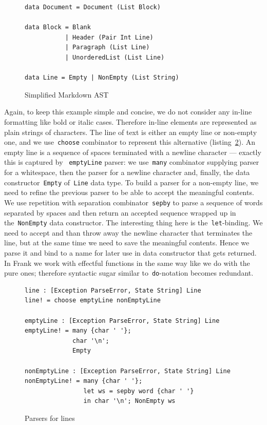       \begin{figure}[h]
      \begin{lstlisting}
data Document = Document (List Block)

data Block = Blank
           | Header (Pair Int Line)
           | Paragraph (List Line)
           | UnorderedList (List Line)

data Line = Empty | NonEmpty (List String)
      \end{lstlisting}
      \caption{Simplified Markdown AST}
      \label{listing:parserMdAstCombo}
      \end{figure}

      Again, to keep this example simple and concise, we do not consider any in-line
      formatting like bold or italic cases. Therefore in-line elements are represented
      as plain strings of characters. The line of text is either an empty line or
      non-empty one, and we use~\texttt{choose} combinator to represent this
      alternative (listing~\ref{listing:parserLineCombo}). An empty line is a sequence of
      spaces terminated with a newline character --- exactly this is captured by
      ~\texttt{emptyLine} parser: we use~\texttt{many} combinator supplying parser
      for a whitespace, then the parser for a newline character and, finally, the
      data constructor~\texttt{Empty} of~\texttt{Line} data type. To build a parser for
      a non-empty line, we need to refine the previous parser to be able to accept the
      meaningful contents. We use repetition with separation combinator~\texttt{sepby}
      to parse a sequence of words separated by spaces and then return an accepted sequence
      wrapped up in the~\texttt{NonEmpty} data constructor. The interesting
      thing here is the~\texttt{let}-binding. We need to accept and than throw away
      the newline character that terminates the line, but at the same time we need to save
      the meaningful contents. Hence we parse it and bind to a name for later use in
      data constructor that gets returned. In Frank we work with
      effectful functions in the same way like we do with the pure ones; therefore
      syntactic sugar similar to~\texttt{do}-notation becomes redundant.

      \begin{figure}[h]
      \begin{lstlisting}
line : [Exception ParseError, State String] Line
line! = choose emptyLine nonEmptyLine

emptyLine : [Exception ParseError, State String] Line
emptyLine! = many {char ' '};
             char '\n';
             Empty

nonEmptyLine : [Exception ParseError, State String] Line
nonEmptyLine! = many {char ' '};
                let ws = sepby word {char ' '}
                in char '\n'; NonEmpty ws
      \end{lstlisting}
      \caption{Parsers for lines}
      \label{listing:parserLineCombo}
      \end{figure}

